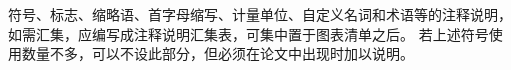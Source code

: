 \begin{symbolsandabbreviations}
    符号、标志、缩略语、首字母缩写、计量单位、自定义名词和术语等的注释说明，如需汇集，应编写成注释说明汇集表，可集中置于图表清单之后。
    若上述符号使用数量不多，可以不设此部分，但必须在论文中出现时加以说明。
\end{symbolsandabbreviations}
